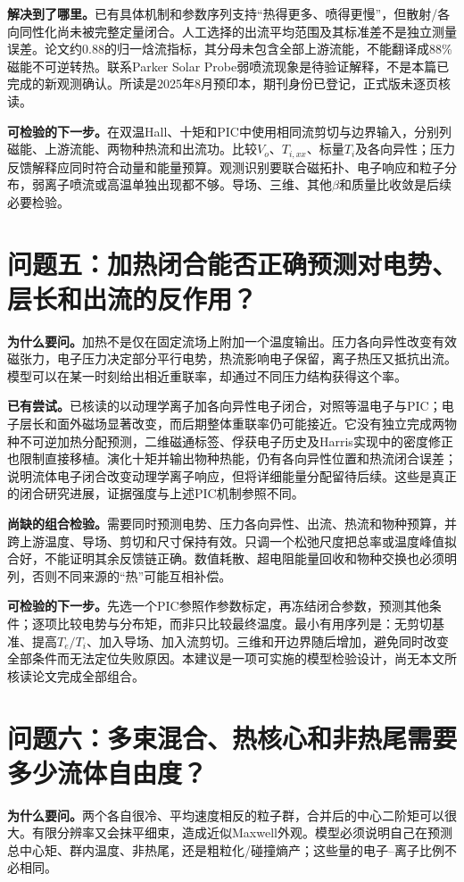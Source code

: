 \textbf{解决到了哪里。}已有具体机制和参数序列支持“热得更多、喷得更慢”，但散射/各向同性化尚未被完整定量闭合。人工选择的出流平均范围及其标准差不是独立测量误差。论文约0.88的归一焓流指标，其分母未包含全部上游流能，不能翻译成88\%磁能不可逆转热。联系Parker Solar Probe弱喷流现象是待验证解释，不是本篇已完成的新观测确认。所读是2025年8月预印本，期刊身份已登记，正式版未逐页核读。

\textbf{可检验的下一步。}在双温Hall、十矩和PIC中使用相同流剪切与边界输入，分别列磁能、上游流能、两物种热流和出流功。比较$V_o$、$T_{i,xx}$、标量$T_i$及各向异性；压力反馈解释应同时符合动量和能量预算。观测识别要联合磁拓扑、电子响应和粒子分布，弱离子喷流或高温单独出现都不够。导场、三维、其他$\beta$和质量比收敛是后续必要检验。


\section{问题五：加热闭合能否正确预测对电势、层长和出流的反作用？}
\textbf{为什么要问。}加热不是仅在固定流场上附加一个温度输出。压力各向异性改变有效磁张力，电子压力决定部分平行电势，热流影响电子保留，离子热压又抵抗出流。模型可以在某一时刻给出相近重联率，却通过不同压力结构获得这个率。

\textbf{已有尝试。}已核读的\citet{F611}以动理学离子加各向异性电子闭合，对照等温电子与PIC；电子层长和面外磁场显著改变，而后期整体重联率仍可能接近。它没有独立完成两物种不可逆加热分配预测，二维磁通标签、俘获电子历史及Harris实现中的密度修正也限制直接移植。\citet{TenBarge2019MMS}演化十矩并输出物种热能，仍有各向异性位置和热流闭合误差；\citet{Finelli2021}说明流体电子闭合改变动理学离子响应，但将详细能量分配留待后续。这些是真正的闭合研究进展，证据强度与上述PIC机制参照不同。

\textbf{尚缺的组合检验。}需要同时预测电势、压力各向异性、出流、热流和物种预算，并跨上游温度、导场、剪切和尺寸保持有效。只调一个松弛尺度把总率或温度峰值拟合好，不能证明其余反馈链正确。数值耗散、超电阻能量回收和物种交换也必须明列，否则不同来源的“热”可能互相补偿。

\textbf{可检验的下一步。}先选一个PIC参照作参数标定，再冻结闭合参数，预测其他条件；逐项比较电势与分布矩，而非只比较最终温度。最小有用序列是：无剪切基准、提高$T_e/T_i$、加入导场、加入流剪切。三维和开边界随后增加，避免同时改变全部条件而无法定位失败原因。本建议是一项可实施的模型检验设计，尚无本文所核读论文完成全部组合。

\section{问题六：多束混合、热核心和非热尾需要多少流体自由度？}
\textbf{为什么要问。}两个各自很冷、平均速度相反的粒子群，合并后的中心二阶矩可以很大。有限分辨率又会抹平细束，造成近似Maxwell外观。模型必须说明自己在预测总中心矩、群内温度、非热尾，还是粗粒化/碰撞熵产；这些量的电子--离子比例不必相同。


